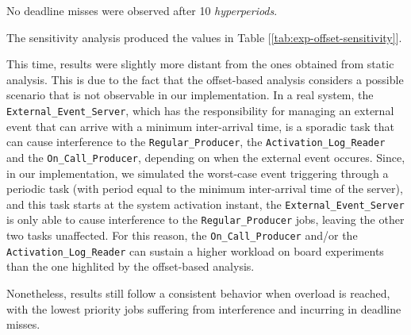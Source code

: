 No deadline misses were observed after 10 \textit{hyperperiods}.

The sensitivity analysis produced the values in Table [\ref{tab:exp-offset-sensitivity}].

\begin{table}
  \centering
  \caption{Offset-based sensitivity results (board experiments)}
  \label{tab:exp-offset-sensitivity}
\end{table}

\label{lab:exp-offset-sensitivity-discussion}
This time, results were slightly more distant from the ones obtained from static
analysis. This is due to the fact that the offset-based analysis considers a
possible scenario that is not observable in our implementation. 
In a real system, the \texttt{External\_Event\_Server}, which has the
responsibility for managing an external event that can arrive with a minimum
inter-arrival time, is a sporadic task that can cause interference to the
\texttt{Regular\_Producer}, the \texttt{Activation\_Log\_Reader} and the
\texttt{On\_Call\_Producer}, depending on when the external event occures.
Since, in our implementation, we simulated the worst-case event triggering through
a periodic task (with period equal to the minimum inter-arrival time of the
server), and this task starts at the system activation instant, the
\texttt{External\_Event\_Server} is only able to cause interference to the
\texttt{Regular\_Producer} jobs, leaving the other two tasks unaffected. 
For this reason, the \texttt{On\_Call\_Producer} and/or the
\texttt{Activation\_Log\_Reader} can sustain a higher workload on board
experiments than the one highlited by the offset-based analysis.

Nonetheless, results still follow a consistent behavior when overload is
reached, with the lowest priority jobs suffering from interference and incurring
in deadline misses. 

